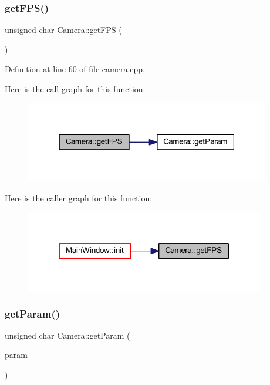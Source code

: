 \subsubsection{\texorpdfstring{getFPS()}{getFPS()}}
{\footnotesize\ttfamily unsigned char Camera\+::get\+F\+PS (\begin{DoxyParamCaption}{ }\end{DoxyParamCaption})}



Definition at line 60 of file camera.\+cpp.

Here is the call graph for this function\+:
\nopagebreak
\begin{figure}[H]
\begin{center}
\leavevmode
\includegraphics[width=303pt]{class_camera_a4702bbf7ccf85a5a2dd61fbf6abb7237_cgraph}
\end{center}
\end{figure}
Here is the caller graph for this function\+:
\nopagebreak
\begin{figure}[H]
\begin{center}
\leavevmode
\includegraphics[width=296pt]{class_camera_a4702bbf7ccf85a5a2dd61fbf6abb7237_icgraph}
\end{center}
\end{figure}
\mbox{\label{class_camera_ab906269480057a5634f0760b3598e71f}} 
\subsubsection{\texorpdfstring{getParam()}{getParam()}}
{\footnotesize\ttfamily unsigned char Camera\+::get\+Param (\begin{DoxyParamCaption}\item[{cv\+::\+Video\+Capture\+Properties}]{param }\end{DoxyParamCaption})}



